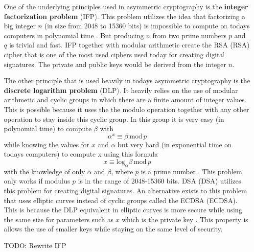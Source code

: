 One of the underlying principles used in asymmetric cryptography is the \textbf{integer factorization problem} (\acs{IFP}). This problem utilizes the idea that factorizing a big integer $n$ (in size from 2048 to 15360 bits) is impossible to compute on todays computers in polynomial time \cite{Paar2010}. But producing $n$ from two prime numbers $p$ and $q$ is trivial and fast. IFP together with modular arithmetic create the RSA (\acl{RSA}) cipher that is one of the most used ciphers used today for creating digital signatures. The private and public keys would be derived from the integer $n$.

The other principle that is used heavily in todays asymmetric cryptography is the \textbf{discrete logarithm problem} (\acs{DLP}). It heavily relies on the use of modular arithmetic and cyclic groups in which there are a finite amount of integer values. This is possible because it uses the the modulo operation together with any other operation to stay inside this cyclic group. In this group it is very easy (in polynomial time) to compute $\beta$ with
\begin{equation}
  \alpha^x\equiv\beta\,\mathrm{mod}\,p
\end{equation}
while knowing the values for $x$ and $\alpha$ but very hard (in exponential time on todays computers) to compute x using this formula
\begin{equation}
  x\equiv\mathrm{log}_\alpha\beta\,\mathrm{mod}\,p
\end{equation}
with the knowledge of only $\alpha$ and $\beta$, where $p$ is a prime number \cite{Paar2010}. This problem only works if modulus $p$ is in the range of 2048-15360 bits. DSA (\acl{DSA}) utilizes this problem for creating digital signatures. An alternative exists to this problem that uses elliptic curves instead of cyclic groups called the \acl{ECDSA} (ECDSA). This is because the DLP equivalent in elliptic curves is more secure while using the same size for parameters such as $x$ which is the private key \cite{Ristic2014}. This property is allows the use of smaller keys while staying on the same level of security.

TODO: Rewrite IFP
